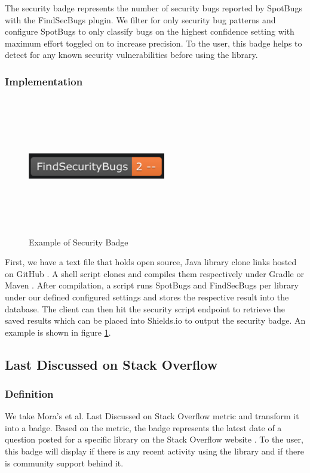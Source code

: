 \documentclass[12pt, letterpaper]{article}
\begin{document}
The security badge represents the number of security bugs reported by SpotBugs \cite{spotbugs} with the FindSecBugs \cite{findsecbugs} plugin.
We filter for only security bug patterns and configure SpotBugs to only classify bugs on the highest confidence setting
with maximum effort toggled on to increase precision. To the user, this badge helps to detect
for any known security vulnerabilities before using the library. 

\subsubsection{Implementation}

\begin{figure}[!htb]
    \centerline{
        \includegraphics[width=6cm,height=6cm,keepaspectratio=true]{findsecbugsbadge}
    }
    \caption{
        Example of Security Badge
    }
    \label{findsecbugsbadge}
\end{figure}

First, we have a text file that holds open source, Java library clone links hosted on GitHub \cite{github}.
A shell script clones and compiles them respectively under Gradle \cite{gradle} or Maven \cite{maven}.
After compilation, a script runs SpotBugs and FindSecBugs per library under our defined configured settings
and stores the respective result
into the database. The client can then hit the security script endpoint to retrieve the saved results which
can be placed into Shields.io \cite{shields} to output the security badge. 
An example is shown in figure \ref{findsecbugsbadge}. 


\subsection{Last Discussed on Stack Overflow}
\subsubsection{Definition}
We take Mora's et al. \cite{metrics} Last Discussed on Stack Overflow metric and transform it 
into a badge. Based on the metric, the badge represents the latest date of a question posted for a specific
library on the Stack Overflow website \cite{stackoverflow}.
To the user, this badge will display if there is any recent activity using the library and if there is
community support behind it.  
\end{document}
